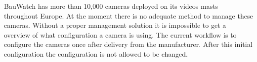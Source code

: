


BauWatch has more than 10,000 cameras deployed on its videos masts throughout Europe. At the moment there is no adequate method to manage these cameras.
Without a proper management solution it is impossible to get a overview of what configuration a camera is using.
The current workflow is to configure the cameras once after delivery from the manufacturer.
After this initial configuration the configuration is not allowed to be changed.

